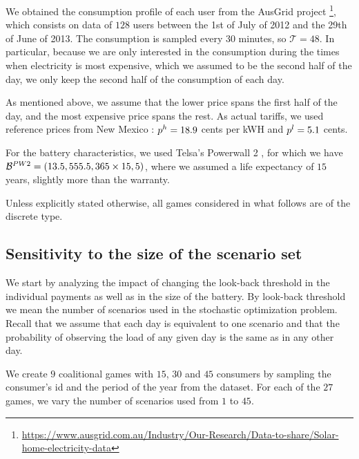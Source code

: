 We obtained the consumption profile of each user from the AusGrid project \cite{ausgrid_analysis}\footnote{\url{https://www.ausgrid.com.au/Industry/Our-Research/Data-to-share/Solar-home-electricity-data}}, which consists on data of $128$ users between the 1st of July of 2012 and the 29th of June of 2013. The consumption is sampled every $30$ minutes, so $\mathcal{T} = 48$. In particular, because we are only interested in the consumption during the times when electricity is most expensive, which we assumed to be the second half of the day, we only keep the second half of the consumption of each day. 

As mentioned above, we assume that the lower price spans the first half of the day, and the most expensive price spans the rest. As actual tariffs, we used reference prices from New Mexico  \cite{mexico_tariff}: $p^h = 18.9$ cents per kWH and $p^l = 5.1$ cents.

For the battery characteristics, we used Telsa's Powerwall 2 \cite{powerwall2}, for which we have $\mathcal{B}^{PW2} = (13.5, 555.5, 365 \times 15, 5)$, where we assumed a life expectancy of $15$ years, slightly more than the warranty.

Unless explicitly stated otherwise, all games considered in what follows are of the discrete type.

\subsection{Sensitivity to the size of the scenario set}\label{sub:sens_scenario}

We start by analyzing the impact of changing the look-back threshold in the individual payments as well as in the size of the battery. By look-back threshold we mean the number of scenarios used in the stochastic optimization problem. Recall that we assume that each day is equivalent to one scenario and that the probability of observing the load of any given day is the same as in any other day.

We create $9$ coalitional games with $15$, $30$ and $45$ consumers  by sampling the consumer's id and the period of the year from the dataset. For each of the $27$ games, we vary the number of scenarios used from $1$ to $45$. 

